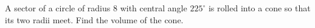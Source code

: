A sector of a circle of radius $8$ with central angle $225^\circ$ is rolled into a cone so that its two radii meet. Find the volume of the cone.
